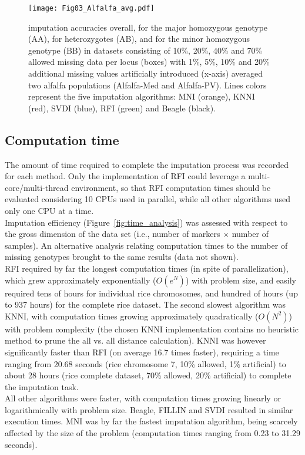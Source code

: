 \begin{figure}
\texttt{[image: Fig03\_Alfalfa\_avg.pdf]}
\caption[Alfalfa imputation accuracies]{
imputation accuracies overall, for the major homozygous genotype (AA), for heterozygotes (AB), and for the minor homozygous genotype (BB) in datasets consisting of 10\%, 20\%, 40\% and 70\% allowed missing data per locus (boxes) with 1\%, 5\%, 10\% and 20\% additional missing values artificially introduced (x-axis) averaged two alfalfa populations (Alfalfa-Med and Alfalfa-PV). Lines colors represent the five imputation algorithms: MNI (orange), KNNI (red), SVDI (blue), RFI (green) and Beagle (black).}
\label{fig:accuracy_alfalfa}
\end{figure}

\subsection{Computation time}
\label{sec:computation_time}  
The amount of time required to complete the imputation process was recorded for each method. Only the implementation of RFI could leverage a multi-core/multi-thread environment, so that RFI computation times should be evaluated considering 10 CPUs used in parallel, while all other algorithms used only one CPU at a time.\\
Imputation efficiency (Figure~\ref{fig:time_analysis}) was assessed with respect to the gross dimension of the data set (i.e., number of markers $\times$ number of samples). An alternative analysis relating computation times to the number of missing genotypes brought to the same results (data not shown).\\
RFI required by far the longest computation times (in spite of parallelization), which grew approximately exponentially ($O(e^N)$) with problem size, and easily required tens of hours for individual rice chromosomes, and hundred of hours (up to 937 hours) for the complete rice dataset. The second slowest algorithm was KNNI, with computation times growing approximately quadratically ($O(N^2)$) with problem complexity (the chosen KNNI implementation contains no heuristic method to prune the all vs. all distance calculation). KNNI was however significantly faster than RFI (on average 16.7 times faster), requiring a time ranging from 20.68 seconds (rice chromosome 7, 10\% allowed, 1\% artificial) to about 28 hours (rice complete dataset, 70\% allowed, 20\% artificial) to complete the imputation task.\\
All other algorithms were faster, with computation times growing linearly or logarithmically with problem size. Beagle, FILLIN and SVDI resulted in similar execution times. MNI was by far the fastest imputation algorithm, being scarcely affected by the size of the problem (computation times ranging from 0.23 to 31.29 seconds).

